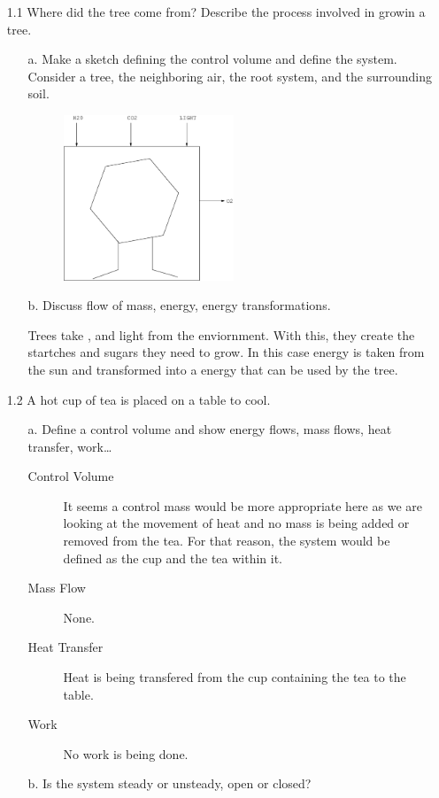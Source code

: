 \documentclass[10pt, a4paper]{article}
\begin{document}

\begin{enumerate}
  \item[1.1] Where did the tree come from? Describe the process involved in growin a tree.

    
    \begin{enumerate}
      \item[a.] Make a sketch defining the control volume and define the system. Consider a tree, the neighboring air, the root system, and the surrounding soil.
        \begin{figure}[h]
          \centering
          \includegraphics[width=2in]{images/tree.eps}
        \end{figure}
        
      \item[b.] Discuss flow of mass, energy, energy transformations.

        Trees take ,  and light from the enviornment. With this, they create the startches and sugars they need to grow. In this case
        energy is taken from the sun and transformed into a energy that can be used by the tree.
    \end{enumerate}

  \item[1.2] A hot cup of tea is placed on a table to cool.
    \begin{enumerate}
      \item[a.] Define a control volume and show energy flows, mass flows, heat transfer, work\dots
        \begin{description}
          \item[Control Volume] It seems a control mass would be more appropriate here as we are looking at the movement of heat and no mass is being added or removed from the tea. For that reason, the system would be defined as the cup and the tea within it.
          \item[Mass Flow] None.
          \item[Heat Transfer] Heat is being transfered from the cup containing the tea to the table.
          \item[Work] No work is being done.
        \end{description}
      \item[b.] Is the system steady or unsteady, open or closed?
        

\end{enumerate}
\end{enumerate}
\end{document}
